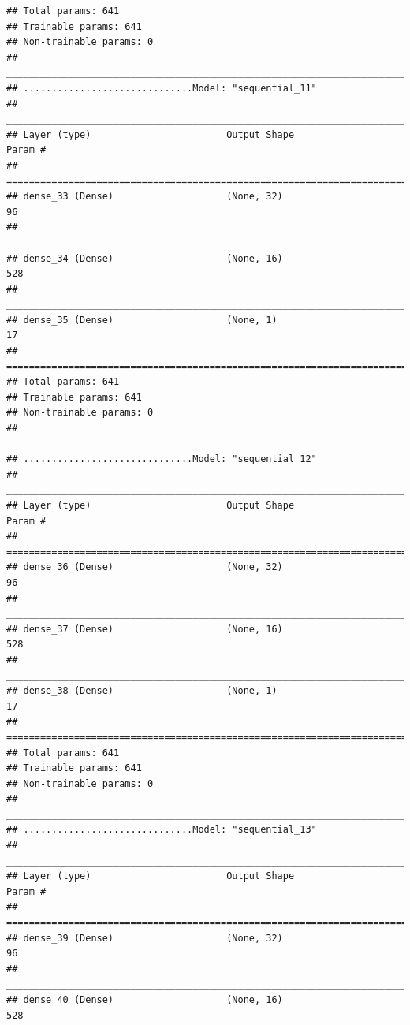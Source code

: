 \documentclass[
]{article}
\begin{document}
\begin{verbatim}
## Total params: 641
## Trainable params: 641
## Non-trainable params: 0
## ________________________________________________________________________________
## ..............................Model: "sequential_11"
## ________________________________________________________________________________
## Layer (type)                        Output Shape                    Param #     
## ================================================================================
## dense_33 (Dense)                    (None, 32)                      96          
## ________________________________________________________________________________
## dense_34 (Dense)                    (None, 16)                      528         
## ________________________________________________________________________________
## dense_35 (Dense)                    (None, 1)                       17          
## ================================================================================
## Total params: 641
## Trainable params: 641
## Non-trainable params: 0
## ________________________________________________________________________________
## ..............................Model: "sequential_12"
## ________________________________________________________________________________
## Layer (type)                        Output Shape                    Param #     
## ================================================================================
## dense_36 (Dense)                    (None, 32)                      96          
## ________________________________________________________________________________
## dense_37 (Dense)                    (None, 16)                      528         
## ________________________________________________________________________________
## dense_38 (Dense)                    (None, 1)                       17          
## ================================================================================
## Total params: 641
## Trainable params: 641
## Non-trainable params: 0
## ________________________________________________________________________________
## ..............................Model: "sequential_13"
## ________________________________________________________________________________
## Layer (type)                        Output Shape                    Param #     
## ================================================================================
## dense_39 (Dense)                    (None, 32)                      96          
## ________________________________________________________________________________
## dense_40 (Dense)                    (None, 16)                      528         

\end{verbatim}
\end{document}
